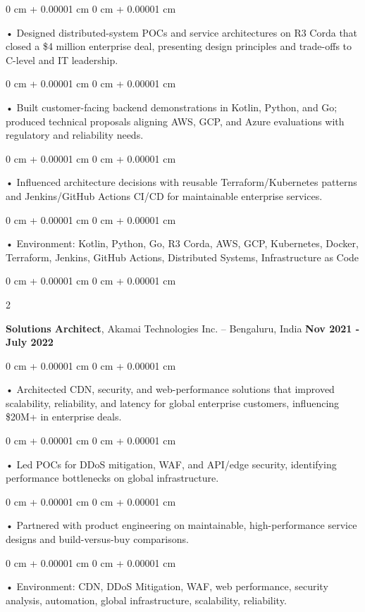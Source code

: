 \documentclass[10pt, letterpaper]{article}
\newenvironment{onecolentry}{
    \begin{adjustwidth}{
        0 cm + 0.00001 cm
    }{
        0 cm + 0.00001 cm
    }
}{
    \end{adjustwidth}
} %
\newenvironment{twocolentry}[2][]{
    \onecolentry
    \def\secondColumn{#2}
    \setcolumnwidth{\fill, 4.5 cm}
    \begin{paracol}{2}
}{
    \switchcolumn \raggedleft \secondColumn
    \end{paracol}
    \endonecolentry
} %
\begin{document}
        \begin{onecolentry}
             • Designed distributed-system POCs and service architectures on R3 Corda that closed a \$4 million enterprise deal, presenting design principles and trade-offs to C-level and IT leadership.
        \end{onecolentry}
        \begin{onecolentry}
             • Built customer-facing backend demonstrations in Kotlin, Python, and Go; produced technical proposals aligning AWS, GCP, and Azure evaluations with regulatory and reliability needs.
        \end{onecolentry}
        \begin{onecolentry}
             • Influenced architecture decisions with reusable Terraform/Kubernetes patterns and Jenkins/GitHub Actions CI/CD for maintainable enterprise services.
        \end{onecolentry}
        \begin{onecolentry}
             • Environment: Kotlin, Python, Go, R3 Corda, AWS, GCP, Kubernetes, Docker, Terraform, Jenkins, GitHub Actions, Distributed Systems, Infrastructure as Code
        \end{onecolentry}
        \vspace{0.1cm}

        \begin{twocolentry}{
            \textbf{Nov 2021 - July 2022}
        }
            \textbf{Solutions Architect}, Akamai Technologies Inc. -- Bengaluru, India \end{twocolentry}
        \begin{onecolentry}
            • Architected CDN, security, and web-performance solutions that improved scalability, reliability, and latency for global enterprise customers, influencing \$20M+ in enterprise deals.
        \end{onecolentry}
        \begin{onecolentry}
            • Led POCs for DDoS mitigation, WAF, and API/edge security, identifying performance bottlenecks on global infrastructure.
        \end{onecolentry}
        \begin{onecolentry}
             • Partnered with product engineering on maintainable, high-performance service designs and build-versus-buy comparisons.
        \end{onecolentry}
        \begin{onecolentry}
             • Environment: CDN, DDoS Mitigation, WAF, web performance, security analysis, automation, global infrastructure, scalability, reliability.
        \end{onecolentry}
\end{document}
